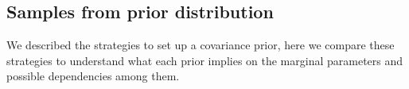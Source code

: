 \documentclass[a4paper]{article}
\begin{document}
\subsection{Samples from  prior distribution} 
We described the strategies to set up a covariance prior, here we compare these strategies to understand what each prior implies on the marginal parameters and possible dependencies among them. 

\end{document}
